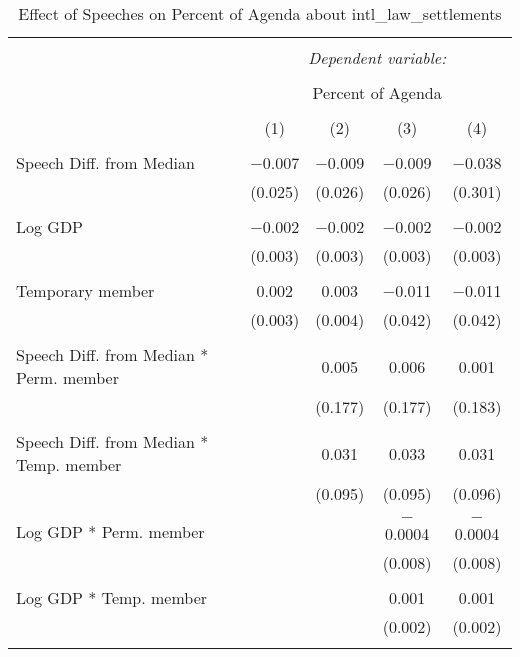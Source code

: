 
\begin{table}[!htbp] \centering 
  \caption{Effect of Speeches on Percent of Agenda about intl_law_settlements} 
  \label{} 
\begin{tabular}{@{\extracolsep{5pt}}lcccc} 
\\[-1.8ex]\hline 
\hline \\[-1.8ex] 
 & \multicolumn{4}{c}{\textit{Dependent variable:}} \\ 
\cline{2-5} 
\\[-1.8ex] & \multicolumn{4}{c}{Percent of Agenda} \\ 
\\[-1.8ex] & (1) & (2) & (3) & (4)\\ 
\hline \\[-1.8ex] 
 Speech Diff. from Median & $-$0.007 & $-$0.009 & $-$0.009 & $-$0.038 \\ 
  & (0.025) & (0.026) & (0.026) & (0.301) \\ 
  & & & & \\ 
 Log GDP & $-$0.002 & $-$0.002 & $-$0.002 & $-$0.002 \\ 
  & (0.003) & (0.003) & (0.003) & (0.003) \\ 
  & & & & \\ 
 Temporary member & 0.002 & 0.003 & $-$0.011 & $-$0.011 \\ 
  & (0.003) & (0.004) & (0.042) & (0.042) \\ 
  & & & & \\ 
 Speech Diff. from Median * Perm. member &  & 0.005 & 0.006 & 0.001 \\ 
  &  & (0.177) & (0.177) & (0.183) \\ 
  & & & & \\ 
 Speech Diff. from Median * Temp. member &  & 0.031 & 0.033 & 0.031 \\ 
  &  & (0.095) & (0.095) & (0.096) \\ 
  & & & & \\ 
 Log GDP * Perm. member &  &  & $-$0.0004 & $-$0.0004 \\ 
  &  &  & (0.008) & (0.008) \\ 
  & & & & \\ 
 Log GDP * Temp. member &  &  & 0.001 & 0.001 \\ 
  &  &  & (0.002) & (0.002) \\ 
  & & & & \\ 

\end{tabular}
\end{table}
